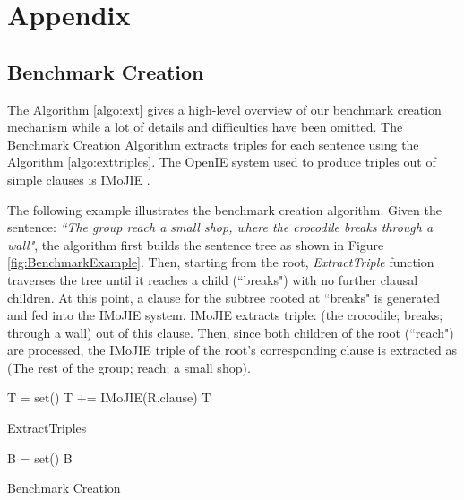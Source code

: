 \documentclass[11pt,a4paper]{article}
\begin{document}



\appendix
\section{Appendix}
\label{sec:appendix}

\subsection{Benchmark Creation}
\label{sec:benchmarkCreation}

The Algorithm \ref{algo:ext} gives a high-level overview of our benchmark creation mechanism while a lot of details and difficulties have been omitted. The Benchmark Creation Algorithm extracts triples for each sentence using the Algorithm \ref{algo:exttriples}. The OpenIE system used to produce triples out of simple clauses is IMoJIE \cite{imojie}.

The following example illustrates the benchmark creation algorithm. Given the sentence: \emph{``The group reach a small shop, where the crocodile breaks through a wall"}, the algorithm first builds the sentence tree as shown in Figure \ref{fig:BenchmarkExample}. 
Then, starting from the root, \emph{ExtractTriple} function traverses the tree until it reaches a child (``breaks") with no further clausal children. At this point, a clause for the subtree rooted at ``breaks" is generated and fed into the IMoJIE system. IMoJIE extracts triple: (the crocodile; breaks; through a wall) out of this clause. Then, since both children of the root (``reach") are processed, the IMoJIE triple of the root's corresponding clause is extracted as (The rest of the group; reach; a small shop).


\begin{algorithm}
    T = set() \;
    T += IMoJIE(R.clause) \;
    \Return T                
    \caption{ExtractTriples}
    \label{algo:exttriples}
\end{algorithm}

\begin{algorithm}
    B = set() \;
    \Return B
    \caption{Benchmark Creation}
    \label{algo:ext}
\end{algorithm}
\end{document}
